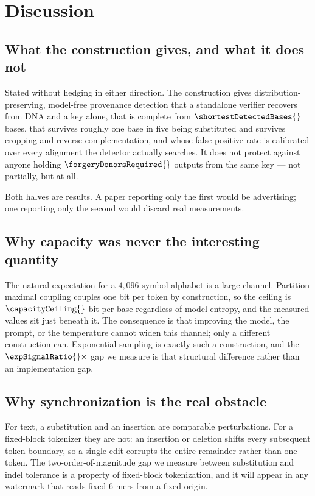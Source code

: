 \section{Discussion}

\subsection{What the construction gives, and what it does not}

Stated without hedging in either direction. The construction gives distribution-preserving, model-free
provenance detection that a standalone verifier recovers from DNA and a key alone, that is complete
from $\shortestDetectedBases{}$ bases, that survives roughly one base in five being substituted and
survives cropping and reverse complementation, and whose false-positive rate is calibrated over every
alignment the detector actually searches. It does not protect against anyone holding
$\forgeryDonorsRequired{}$ outputs from the same key --- not partially, but at all.

Both halves are results. A paper reporting only the first would be advertising; one reporting only the
second would discard real measurements.

\subsection{Why capacity was never the interesting quantity}

The natural expectation for a $4{,}096$-symbol alphabet is a large channel. Partition maximal coupling
couples one bit per token by construction, so the ceiling is $\capacityCeiling{}$ bit per base
regardless of model entropy, and the measured values sit just beneath it. The consequence is that
improving the model, the prompt, or the temperature cannot widen this channel; only a different
construction can. Exponential sampling is exactly such a construction, and the
$\expSignalRatio{}\times$ gap we measure is that structural difference rather than an implementation
gap.

\subsection{Why synchronization is the real obstacle}

For text, a substitution and an insertion are comparable perturbations. For a fixed-block tokenizer
they are not: an insertion or deletion shifts every subsequent token boundary, so a single edit
corrupts the entire remainder rather than one token. The two-order-of-magnitude gap we measure between
substitution and indel tolerance is a property of fixed-block tokenization, and it will appear in any
watermark that reads fixed 6-mers from a fixed origin.

